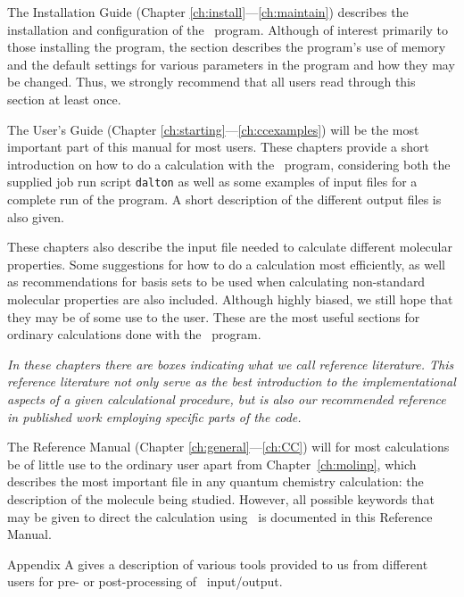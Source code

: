 \begin{description}
\item The Installation Guide (Chapter
\ref{ch:install}---\ref{ch:maintain}) describes the
installation and configuration of the \dalton\ program. Although of
interest primarily to those installing the program, the section
describes the program's use of memory and the default settings for
various parameters in the program and how they may be changed. Thus,
we strongly recommend that all users read through this section at least
once.

\item The User's Guide (Chapter
\ref{ch:starting}---\ref{ch:ccexamples}) will be the most important
part of this manual for most users. These chapters provide a  short
introduction on how to do a calculation with the \dalton\ program,
considering both the supplied job run script {\tt dalton}
as well as some examples of
input files for a complete run of the program. A short description of
the different output files is also given.

These chapters also describe the input file needed to
calculate different molecular properties. Some
suggestions for how to do a calculation most efficiently, as well as
recommendations for basis sets to be used when calculating non-standard
molecular properties are also included. Although highly biased, we
still hope that they may be of some
use to the user. These are the most useful sections for
ordinary calculations done with the \dalton\ program.

{\em In these chapters there are boxes indicating what we call {\em
reference literature}. This reference
literature not only serve as
the best introduction to the implementational aspects of a given
calculational procedure, but is also our recommended reference in published
work employing specific parts of the code.}

\item The Reference Manual (Chapter \ref{ch:general}---\ref{ch:CC})
will for most calculations be of 
little use to the ordinary user apart from Chapter~\ref{ch:molinp},
which describes
the most important file in any quantum chemistry calculation: the
description of the molecule being studied. However, all possible
keywords that may be given to direct the calculation using \dalton\ is
documented in this Reference Manual.

\item Appendix A gives a description of various tools provided to us
from different users for pre- or post-processing of \dalton\
input/output.
\end{description}

